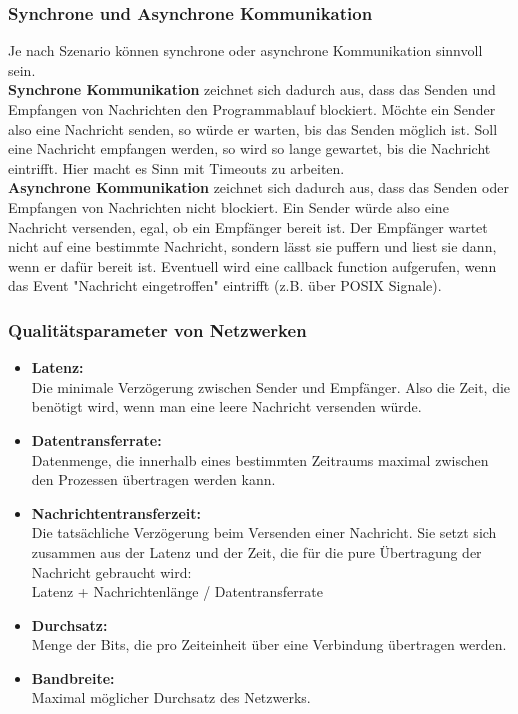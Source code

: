 \subsubsection{Synchrone und Asynchrone Kommunikation}
Je nach Szenario können synchrone oder asynchrone Kommunikation sinnvoll sein.\\
\textbf{Synchrone Kommunikation} zeichnet sich dadurch aus, dass das Senden und Empfangen von Nachrichten den Programmablauf blockiert. Möchte ein Sender also eine Nachricht senden, so würde er warten, bis das Senden möglich ist. Soll eine Nachricht empfangen werden, so wird so lange gewartet, bis die Nachricht eintrifft. Hier macht es Sinn mit Timeouts zu arbeiten.\\
\textbf{Asynchrone Kommunikation} zeichnet sich dadurch aus, dass das Senden oder Empfangen von Nachrichten nicht blockiert. Ein Sender würde also eine Nachricht versenden, egal, ob ein Empfänger bereit ist. Der Empfänger wartet nicht auf eine bestimmte Nachricht, sondern lässt sie puffern und liest sie dann, wenn er dafür bereit ist. Eventuell wird eine callback function aufgerufen, wenn das Event "Nachricht eingetroffen" eintrifft (z.B. über POSIX Signale).

\subsubsection{Qualitätsparameter von Netzwerken}
\begin{itemize}
    \item \textbf{Latenz:}\\
          Die minimale Verzögerung zwischen Sender und Empfänger. Also die Zeit, die benötigt wird, wenn man eine leere Nachricht versenden würde.
    \item \textbf{Datentransferrate:}\\
          Datenmenge, die innerhalb eines bestimmten Zeitraums maximal zwischen den Prozessen übertragen werden kann.
    \item \textbf{Nachrichtentransferzeit:}\\
          Die tatsächliche Verzögerung beim Versenden einer Nachricht. Sie setzt sich zusammen aus der Latenz und der Zeit, die für die pure Übertragung der Nachricht gebraucht wird:\\
          Latenz + Nachrichtenlänge / Datentransferrate
    \item \textbf{Durchsatz:}\\
          Menge der Bits, die pro Zeiteinheit über eine Verbindung übertragen werden.
    \item \textbf{Bandbreite:}\\
          Maximal möglicher Durchsatz des Netzwerks.
\end{itemize}

